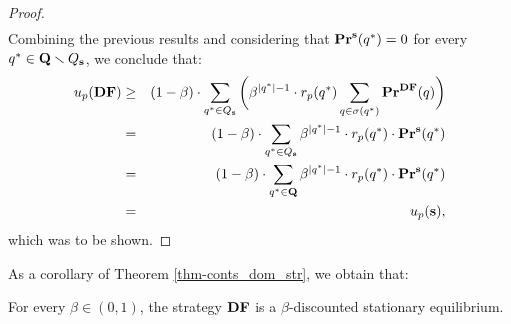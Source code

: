 \begin{proof}
\begin{eqnarray*}
\end{eqnarray*}
Combining the previous results and considering that $\mathbf{Pr}^{\mathbf{s}}(q^*) = 0$ for every $q^* \in \mathbf{Q} \smallsetminus Q_{\mathbf{s}}$, we conclude that: 
\begin{eqnarray*}
u_p(\text{\rm {\bf DF}}) & \geq & (1-\beta) \cdot \sum_{q^* \in Q_{\mathbf{s}}} \bigg(\beta^{|q^*|-1} \cdot  r_p(q^*) \sum_{q \in \sigma(q^*)}  \mathbf{Pr}^{\text{\rm {\bf DF}}}(q)\bigg)\\
& = &(1-\beta) \cdot  \sum_{q^* \in Q_{\mathbf{s}}} \beta^{|q^*|-1} \cdot  r_p(q^*) \cdot \mathbf{Pr}^{\mathbf{s}}(q^*)\\
& = &(1-\beta) \cdot  \sum_{q^* \in \mathbf{Q}} \beta^{|q^*|-1} \cdot  r_p(q^*) \cdot \mathbf{Pr}^{\mathbf{s}}(q^*)\\
& = & u_p(\mathbf{s}), 
\end{eqnarray*}
which was to be shown.
\end{proof}
As a corollary of Theorem \ref{thm-conts_dom_str}, we obtain that:
\begin{mycor}\label{cor-conts_equlibria}
For every $\beta \in (0,1)$, the strategy $\text{\rm {\bf DF}}$ is a $\beta$-discounted stationary equilibrium.
\end{mycor} 

